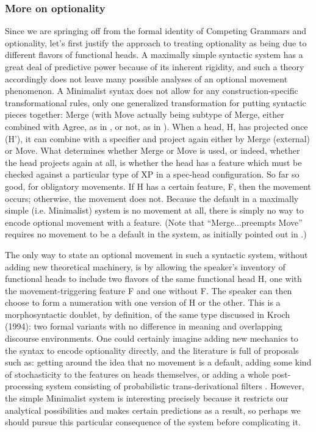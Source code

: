\subsubsection{More on optionality}
Since we are springing off from the formal identity of Competing Grammars and optionality, let's first justify the approach to treating optionality as being due to different flavors of functional heads.
A maximally simple syntactic system has a great deal of predictive power because of its inherent rigidity, and such a theory accordingly does not leave many possible analyses of an optional movement phenomenon.
A Minimalist syntax does not allow for any construction-specific transformational rules, only one generalized transformation for putting syntactic pieces together: Merge (with Move actually being subtype of Merge, either combined with Agree, as in \citealt{chomsky2000}, or not, as in \citealt{chomsky2004, chomsky2008}).
When a head, H, has projected once (H'), it can combine with a specifier and project again either by Merge (external) or Move.
What determines whether Merge or Move is used, or indeed, whether the head projects again at all, is whether the head has a feature which must be checked against a particular type of XP in a spec-head configuration.
So far so good, for obligatory movements.
If H has a certain feature, F, then the movement occurs; otherwise, the movement does not.
Because the default in a maximally simple (i.e. Minimalist) system is no movement at all, there is simply no way to encode optional movement with a feature.
(Note that ``Merge...preempts Move'' requires no movement to be a default in the system, as initially pointed out in \citealt{chomsky2000}.)

The only way to state an optional movement in such a syntactic system, without adding new theoretical machinery, is by allowing the speaker's inventory of functional heads to include two flavors of the same functional head H, one with the movement-triggering feature F and one without F.
The speaker can then choose to form a numeration with one version of H or the other.
This is a morphosyntactic doublet, by definition, of the same type discussed in Kroch (1994): two formal variants with no difference in meaning and overlapping discourse environments.
One could certainly imagine adding new mechanics to the syntax to encode optionality directly, and the literature is full of proposals such as: getting around the idea that no movement is a default, adding some kind of stochasticity to the features on heads themselves, or adding a whole post-processing system consisting of probabilistic trans-derivational filters .
However, the simple Minimalist system is interesting precisely because it restricts our analytical possibilities and makes certain predictions as a result, so perhaps we should pursue this particular consequence of the system before complicating it.

